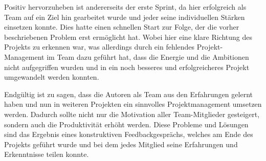 Positiv hervorzuheben ist andererseits der erste Sprint, da hier erfolgreich als Team auf ein Ziel hin gearbeitet wurde und jeder seine individuellen Stärken einsetzen konnte.
Dies hatte einen schnellen Start zur Folge, der die vorher beschriebenen Problem erst ermöglicht hat.
Wobei hier eine klare Richtung des Projekts zu erkennen war, was allerdings durch ein fehlendes Projekt-Management im Team dazu geführt hat, dass die Energie und die Ambitionen nicht aufgegriffen wurden und in ein noch besseres und erfolgreicheres Projekt umgewandelt werden konnten.

Endgültig ist zu sagen, dass die Autoren als Team aus den Erfahrungen gelernt haben und nun in weiteren Projekten ein sinnvolles Projektmanagement umsetzen werden.
Dadurch sollte nicht nur die Motivation aller Team-Mitglieder gesteigert, sondern auch die Produktivität erhöht werden.
Diese Probleme und Lösungen sind das Ergebnis eines konstruktiven Feedbackgesprächs, welches am Ende des Projekts geführt wurde und bei dem jedes Mitglied seine Erfahrungen und Erkenntnisse teilen konnte.
